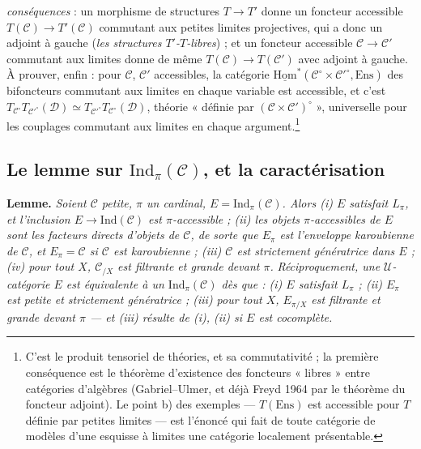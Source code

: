 \documentclass[11pt,a4paper]{article}
\begin{document}
\emph{conséquences} : un morphisme de structures $T \to T'$ donne un
foncteur accessible $T(\mathcal{C}) \to T'(\mathcal{C})$ commutant aux
petites limites projectives, qui a donc un adjoint à gauche (\emph{les
structures $T'$-$T$-libres}) ; et un foncteur accessible $\mathcal{C} \to
\mathcal{C}'$ commutant aux limites donne de même $T(\mathcal{C}) \to
T(\mathcal{C}')$ avec adjoint à gauche. À prouver, enfin : pour
$\mathcal{C}$, $\mathcal{C}'$ accessibles, la catégorie
$\underline{\mathrm{Hom}}^{*}(\mathcal{C}^{\circ} \times \mathcal{C}'^{\circ},
\mathrm{Ens})$ des bifoncteurs commutant aux limites en chaque variable
est accessible, et c'est $T_{\mathcal{C}^{\circ}}T_{\mathcal{C}'^{\circ}}
(\mathcal{D}) \simeq T_{\mathcal{C}'^{\circ}}T_{\mathcal{C}^{\circ}}(\mathcal{D})$,
théorie « définie par $(\mathcal{C} \times \mathcal{C}')^{\circ}$ »,
universelle pour les couplages commutant aux limites en chaque
argument.\footnote{C'est le produit tensoriel de théories, et sa
commutativité ; la première conséquence est le théorème d'existence des
foncteurs « libres » entre catégories d'algèbres (Gabriel--Ulmer, et déjà
Freyd 1964 par le théorème du foncteur adjoint). Le point b) des
exemples — $T(\mathrm{Ens})$ est accessible pour $T$ définie par petites
limites — est l'énoncé qui fait de toute catégorie de modèles d'une
esquisse à limites une catégorie localement présentable.}

\subsection*{Le lemme sur $\mathrm{Ind}_{\pi}(\mathcal{C})$, et la caractérisation}

\textbf{Lemme.} \emph{Soient $\mathcal{C}$ petite, $\pi$ un cardinal, $E =
\mathrm{Ind}_{\pi}(\mathcal{C})$. Alors (i) $E$ satisfait $L_{\pi}$, et
l'inclusion $E \to \mathrm{Ind}(\mathcal{C})$ est $\pi$-accessible ; (ii) les
objets $\pi$-accessibles de $E$ sont les facteurs directs d'objets de
$\mathcal{C}$, de sorte que $E_{\pi}$ est l'enveloppe karoubienne de
$\mathcal{C}$, et $E_{\pi} = \mathcal{C}$ si $\mathcal{C}$ est karoubienne ;
(iii) $\mathcal{C}$ est strictement génératrice dans $E$ ; (iv) pour tout
$X$, $\mathcal{C}_{/X}$ est filtrante et grande devant $\pi$.}
\emph{Réciproquement, une $\mathcal{U}$-catégorie $E$ est équivalente à un
$\mathrm{Ind}_{\pi}(\mathcal{C})$ dès que : (i) $E$ satisfait $L_{\pi}$ ;
(ii) $E_{\pi}$ est petite et strictement génératrice ; (iii) pour tout $X$,
$E_{\pi/X}$ est filtrante et grande devant $\pi$ — et (iii) résulte de
(i), (ii) si $E$ est cocomplète.}
\end{document}
